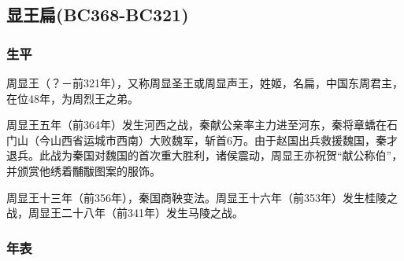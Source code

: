 
\subsection{显王扁{\tiny(BC368-BC321)}}

\subsubsection{生平}

周显王（？－前321年），又称周显圣王或周显声王，姓姬，名扁，中国东周君主，在位48年，为周烈王之弟。

周显王五年（前364年）发生河西之战，秦献公亲率主力进至河东，秦将章蟜在石门山（今山西省运城市西南）大败魏军，斩首6万。由于赵国出兵救援魏国，秦才退兵。此战为秦国对魏国的首次重大胜利，诸侯震动，周显王亦祝贺“献公称伯”，并颁赏他绣着黼黻图案的服饰。

周显王十三年（前356年），秦国商鞅变法。周显王十六年（前353年）发生桂陵之战，周显王二十八年（前341年）发生马陵之战。

\subsubsection{年表}

